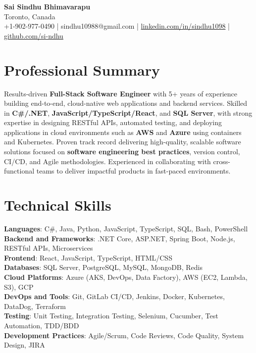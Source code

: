 \documentclass[letterpaper,11pt]{article}
\begin{document}
\begin{center}
  {\Large \textbf{Sai Sindhu Bhimavarapu}} \\
  Toronto, Canada \\
  +1-902-977-0490 \enspace | \enspace sindhu10988@gmail.com \enspace | \enspace \href{https://www.linkedin.com/in/sindhu1098/}{linkedin.com/in/sindhu1098} \enspace | \enspace \href{https://github.com/si-ndhu}{github.com/si-ndhu}
\end{center}

\section{Professional Summary}
  \begin{itemize}[leftmargin=0.15in, label={}]
    \small{\item{
     Results-driven \textbf{Full-Stack Software Engineer} with 5+ years of experience building end-to-end, cloud-native web applications and backend services. Skilled in \textbf{C\#/.NET}, \textbf{JavaScript/TypeScript/React}, and \textbf{SQL Server}, with strong expertise in designing RESTful APIs, automated testing, and deploying applications in cloud environments such as \textbf{AWS} and \textbf{Azure} using containers and Kubernetes. Proven track record delivering high-quality, scalable software solutions focused on \textbf{software engineering best practices}, version control, CI/CD, and Agile methodologies. Experienced in collaborating with cross-functional teams to deliver impactful products in fast-paced environments.
    }}
  \end{itemize}
\vspace{-16pt}

\section{Technical Skills}
 \begin{itemize}[leftmargin=0.15in, label={}]
    \small{\item{
     \textbf{Languages}: C\#, Java, Python, JavaScript, TypeScript, SQL, Bash, PowerShell \\
     \textbf{Backend and Frameworks}: .NET Core, ASP.NET, Spring Boot, Node.js, RESTful APIs, Microservices \\
     \textbf{Frontend}: React, JavaScript, TypeScript, HTML/CSS \\
     \textbf{Databases}: SQL Server, PostgreSQL, MySQL, MongoDB, Redis \\
     \textbf{Cloud Platforms}: Azure (AKS, DevOps, Data Factory), AWS (EC2, Lambda, S3), GCP \\
     \textbf{DevOps and Tools}: Git, GitLab CI/CD, Jenkins, Docker, Kubernetes, DataDog, Terraform \\
     \textbf{Testing}: Unit Testing, Integration Testing, Selenium, Cucumber, Test Automation, TDD/BDD \\
     \textbf{Development Practices}: Agile/Scrum, Code Reviews, Code Quality, System Design, JIRA
    }}
 \end{itemize}
\vspace{-16pt}
\end{document}
